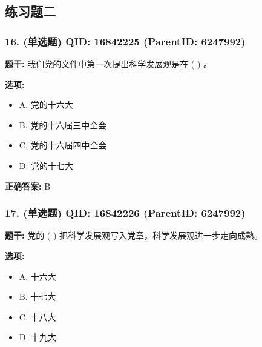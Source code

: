 \documentclass[12pt,UTF8]{ctexart}
\begin{document}
\vspace{0.3em}\hrulefill\vspace{0.7em}

\subsection*{练习题二}

\subsubsection*{16. (单选题) \small QID: 16842225 (ParentID: 6247992)}

\textbf{题干:}
我们党的文件中第一次提出科学发展观是在 ( ) 。



\textbf{选项:}
\begin{itemize}[leftmargin=*]

  \item A. 党的十六大

  \item B. 党的十六届三中全会

  \item C. 党的十六届四中全会

  \item D. 党的十七大

\end{itemize}

\textbf{正确答案:}
B

\vspace{0.3em}\hrulefill\vspace{0.7em}

\subsubsection*{17. (单选题) \small QID: 16842226 (ParentID: 6247992)}

\textbf{题干:}
党的 ( ) 把科学发展观写入党章，科学发展观进一步走向成熟。



\textbf{选项:}
\begin{itemize}[leftmargin=*]

  \item A. 十六大

  \item B. 十七大

  \item C. 十八大

  \item D. 十九大

\end{itemize}
\end{document}
